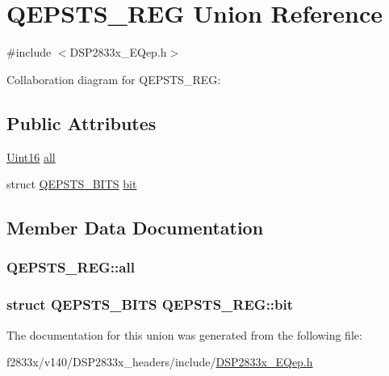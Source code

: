 \hypertarget{union_q_e_p_s_t_s___r_e_g}{}\section{Q\+E\+P\+S\+T\+S\+\_\+\+R\+E\+G Union Reference}
\label{union_q_e_p_s_t_s___r_e_g}


{\ttfamily \#include $<$D\+S\+P2833x\+\_\+\+E\+Qep.\+h$>$}



Collaboration diagram for Q\+E\+P\+S\+T\+S\+\_\+\+R\+E\+G\+:
\subsection*{Public Attributes}
\begin{DoxyCompactItemize}
\item 
\hyperlink{_d_s_p2833x___device_8h_a59a9f6be4562c327cbfb4f7e8e18f08b}{Uint16} \hyperlink{union_q_e_p_s_t_s___r_e_g_a41f62e294031446e3746f26ddd0aa3b2}{all}
\item 
struct \hyperlink{struct_q_e_p_s_t_s___b_i_t_s}{Q\+E\+P\+S\+T\+S\+\_\+\+B\+I\+T\+S} \hyperlink{union_q_e_p_s_t_s___r_e_g_a48d1af0018d5c776d8ab56f1a46e8793}{bit}
\end{DoxyCompactItemize}


\subsection{Member Data Documentation}
\hypertarget{union_q_e_p_s_t_s___r_e_g_a41f62e294031446e3746f26ddd0aa3b2}{}
\subsubsection[{all}]{ Q\+E\+P\+S\+T\+S\+\_\+\+R\+E\+G\+::all}\label{union_q_e_p_s_t_s___r_e_g_a41f62e294031446e3746f26ddd0aa3b2}
\hypertarget{union_q_e_p_s_t_s___r_e_g_a48d1af0018d5c776d8ab56f1a46e8793}{}
\subsubsection[{bit}]{\setlength{\rightskip}{0pt plus 5cm}struct {\bf Q\+E\+P\+S\+T\+S\+\_\+\+B\+I\+T\+S} Q\+E\+P\+S\+T\+S\+\_\+\+R\+E\+G\+::bit}\label{union_q_e_p_s_t_s___r_e_g_a48d1af0018d5c776d8ab56f1a46e8793}


The documentation for this union was generated from the following file\+:\begin{DoxyCompactItemize}
\item 
f2833x/v140/\+D\+S\+P2833x\+\_\+headers/include/\hyperlink{_d_s_p2833x___e_qep_8h}{D\+S\+P2833x\+\_\+\+E\+Qep.\+h}\end{DoxyCompactItemize}
